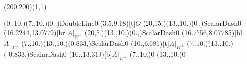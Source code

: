 \unitlength=1bp%

\begin{feynartspicture}(200,200)(1,1)

\FADiagram{}
\FAProp(0.,10.)(7.,10.)(0.,){DoubleLine}{0}
\FALabel(3.5,9.18)[t]{$O$}
\FAProp(20,15.)(13.,10.)(0.,){ScalarDash}{0}
\FALabel(16.2244,13.0779)[br]{$A|_{W^\perp}$}
\FAProp(20,5.)(13.,10.)(0.,){ScalarDash}{0}
\FALabel(16.7756,8.07785)[bl]{$A|_{W^\perp}$}
\FAProp(7.,10.)(13.,10.)(0.833,){ScalarDash}{0}
\FALabel(10.,6.681)[t]{$A|_{W^\perp}$}
\FAProp(7.,10.)(13.,10.)(-0.833,){ScalarDash}{0}
\FALabel(10.,13.319)[b]{$A|_{W^\perp}$}
\FAVert(7.,10.){0}
\FAVert(13.,10.){0}
\end{feynartspicture}

